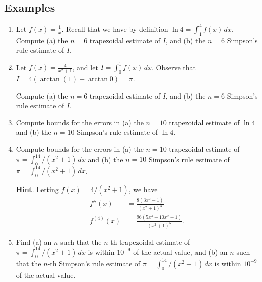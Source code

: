 \documentclass[11pt]{article}
\theoremstyle{definition}
\theoremstyle{named}
\numberwithin{myalgctr}{section}
\begin{document}
\subsection*{Examples}
\begin{enumerate}
  \item Let $f(x)=\frac{1}{x}$. Recall that we have by definition $\ln 4=\int_1^4f(x)\, dx$. Compute (a) the $n=6$ trapezoidal estimate of $I$, and (b) the $n=6$ Simpson's rule estimate of $I$.
  \item Let $f(x)=\frac{4}{x^2+1}$, and let $I=\int_0^1f(x)\, dx$. Observe that $I=4(\arctan(1)-\arctan 0)=\pi$.

  Compute (a) the $n=6$ trapezoidal estimate of $I$, and (b) the $n=6$ Simpson's rule estimate of $I$.

  \item Compute bounds for the errors in (a) the $n=10$ trapezoidal estimate of $\ln 4$ and (b) the $n=10$ Simpson's rule estimate of $\ln 4$.

  \item Compute bounds for the errors in (a) the $n=10$ trapezoidal estimate of $\pi=\int_0^14/(x^2+1)\, dx$ and (b) the $n=10$ Simpson's rule estimate of $\pi=\int_0^14/(x^2+1)\, dx$.

  {\bf Hint}. Letting $f(x)=4/(x^2+1)$, we have
  \begin{align*}
    f''(x)&=\frac{8(3x^2-1)}{(x^2+1)^3}\\
    f^{(4)}(x)&=\frac{96(5x^4-10x^2+1)}{(x^2+1)^5}.
  \end{align*}
  \item Find (a) an $n$ such that the $n$-th trapezoidal estimate of $\pi=\int_0^14/(x^2+1)\, dx$ is within $10^{-9}$ of the actual value, and (b) an $n$ such that the $n$-th Simpson's rule estimate of $\pi=\int_0^14/(x^2+1)\, dx$ is within $10^{-9}$ of the actual value.
\end{enumerate}
\end{document}

